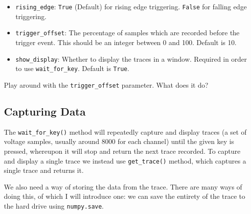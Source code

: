 \documentclass{article}
\begin{document}
\begin{itemize}
    \item \texttt{rising\_edge}: \texttt{True} (Default) for rising edge triggering. \texttt{False} for falling edge triggering.
    
    \item \texttt{trigger\_offset}: The percentage of samples which are recorded before the trigger event. This should be an integer between 0 and 100. Default is 10.
    
    \item \texttt{show\_display}: Whether to display the traces in a window. Required in order to use \texttt{wait\_for\_key}. Default is \texttt{True}.
    

\end{itemize}
Play around with the \texttt{trigger\_offset} parameter. What does it do?

\subsection{Capturing Data}
The \texttt{wait\_for\_key()} method will repeatedly capture and display traces (a set of voltage samples, usually around 8000 for each channel) until the given key is pressed, whereupon it will stop and return the next trace recorded. To capture and display a single trace we instead use \texttt{get\_trace()} method, which captures a single trace and returns it.

We also need a way of storing the data from the trace. There are many ways of doing this, of which I will introduce one: we can save the entirety of the trace to the hard drive using \texttt{numpy.save}.
\end{document}

